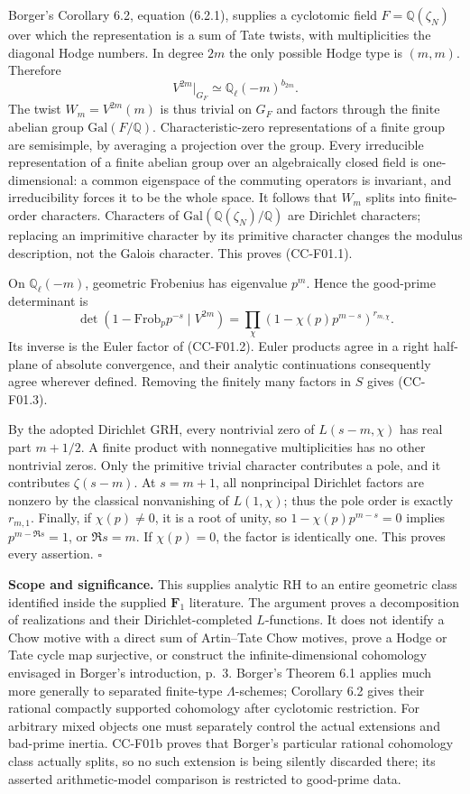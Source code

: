 \documentclass[11pt,a4paper]{article}
\theoremstyle{definition}\newtheorem{definition}[theorem]{Definition}
\theoremstyle{remark}\newtheorem{remark}[theorem]{Remark}
\begin{document}
Borger's Corollary 6.2, equation (6.2.1), supplies a cyclotomic field
\(F=\mathbb Q(\zeta_N)\) over which the representation is a sum of Tate
twists, with multiplicities the diagonal Hodge numbers. In degree \(2m\)
the only possible Hodge type is \((m,m)\). Therefore \[
 V^{2m}|_{G_F}\simeq\mathbb Q_\ell(-m)^{b_{2m}}.
\] The twist \(W_m=V^{2m}(m)\) is thus trivial on \(G_F\) and factors
through the finite abelian group \(\mathrm{Gal}(F/\mathbb Q)\).
Characteristic-zero representations of a finite group are semisimple, by
averaging a projection over the group. Every irreducible representation
of a finite abelian group over an algebraically closed field is
one-dimensional: a common eigenspace of the commuting operators is
invariant, and irreducibility forces it to be the whole space. It
follows that \(W_m\) splits into finite-order characters. Characters of
\(\mathrm{Gal}(\mathbb Q(\zeta_N)/\mathbb Q)\) are Dirichlet characters;
replacing an imprimitive character by its primitive character changes
the modulus description, not the Galois character. This proves
(CC-F01.1).

On \(\mathbb Q_\ell(-m)\), geometric Frobenius has eigenvalue \(p^m\).
Hence the good-prime determinant is \[
 \det(1-\mathrm{Frob}_p p^{-s}\mid V^{2m})
   =\prod_\chi(1-\chi(p)p^{m-s})^{r_{m,\chi}}.
\] Its inverse is the Euler factor of (CC-F01.2). Euler products agree
in a right half-plane of absolute convergence, and their analytic
continuations consequently agree wherever defined. Removing the finitely
many factors in \(S\) gives (CC-F01.3).

By the adopted Dirichlet GRH, every nontrivial zero of \(L(s-m,\chi)\)
has real part \(m+1/2\). A finite product with nonnegative
multiplicities has no other nontrivial zeros. Only the primitive trivial
character contributes a pole, and it contributes \(\zeta(s-m)\). At
\(s=m+1\), all nonprincipal Dirichlet factors are nonzero by the
classical nonvanishing of \(L(1,\chi)\); thus the pole order is exactly
\(r_{m,1}\). Finally, if \(\chi(p)\ne0\), it is a root of unity, so
\(1-\chi(p)p^{m-s}=0\) implies \(p^{m-\Re s}=1\), or \(\Re s=m\). If
\(\chi(p)=0\), the factor is identically one. This proves every
assertion. \(\square\)

\textbf{Scope and significance.} This supplies analytic RH to an entire
geometric class identified inside the supplied \(\mathbf F_1\)
literature. The argument proves a decomposition of realizations and
their Dirichlet-completed \(L\)-functions. It does not identify a Chow
motive with a direct sum of Artin--Tate Chow motives, prove a Hodge or
Tate cycle map surjective, or construct the infinite-dimensional
cohomology envisaged in Borger's introduction, p.~3. Borger's Theorem
6.1 applies much more generally to separated finite-type
\(\Lambda\)-schemes; Corollary 6.2 gives their rational compactly
supported cohomology after cyclotomic restriction. For arbitrary mixed
objects one must separately control the actual extensions and bad-prime
inertia. CC-F01b proves that Borger's particular rational cohomology
class actually splits, so no such extension is being silently discarded
there; its asserted arithmetic-model comparison is restricted to
good-prime data.
\end{document}
